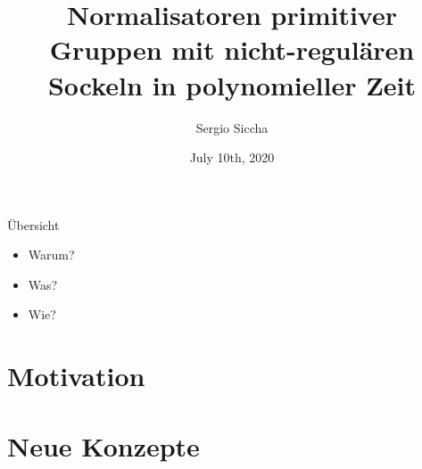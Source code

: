 \documentclass{beamer}
\title{Normalisatoren primitiver Gruppen mit nicht-regulären
Sockeln in polynomieller Zeit}
\date{July 10th, 2020}
\author{Sergio Siccha}
\theoremstyle{plain}
\theoremstyle{definition}
\begin{document}
\maketitle
{}



\begin{frame}{Übersicht}
\begin{itemize}
\setlength{\itemsep}{\fill}
\item Warum?
\item Was?
\item Wie?
\end{itemize}
\end{frame}

\section{Motivation}


\section{Neue Konzepte}

\end{document}
